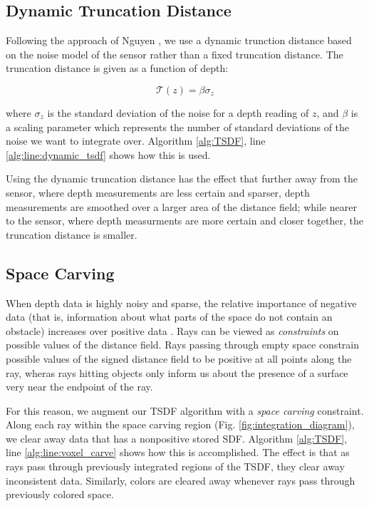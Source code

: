 \documentclass[10pt,twocolumn,letterpaper]{article}
\begin{document}
\subsection{Dynamic Truncation Distance}
\label{section:dynamic_trunc}
Following the approach of Nguyen \etal\cite{Nguyen2012}, we use a dynamic
trunction distance based on the noise model of the sensor rather than a fixed
truncation distance. The truncation distance is given as a function of depth:

\begin{equation} \mathcal{T} (z) = \beta\sigma_{z} \end{equation}

\noindent where $\sigma_{z}$ is the standard deviation of the noise for a depth
reading of $z$, and $\beta$ is a scaling parameter which represents the number of
standard deviations of the noise we want to integrate over. Algorithm
\ref{alg:TSDF}, line \ref{alg:line:dynamic_tsdf} shows how this is used.

Using the dynamic truncation distance has the effect that further away from the
sensor, where depth measurements are less certain and sparser, depth
measurements are smoothed over a larger area of the distance field; while nearer
to the sensor, where depth measurments are more certain and closer together, the
truncation distance is smaller.

\subsection{Space Carving}
\label{section:carving}
When depth data is highly noisy and sparse, the relative importance of negative
data (that is, information about what parts of the space do not contain an
obstacle) increases over positive data \cite{Klingensmith2014}. Rays can be
viewed as \textit{constraints} on possible values of the distance field. Rays
passing through empty space constrain possible values of the signed distance
field to be positive at all points along the ray, wheras rays hitting objects 
only inform us about the presence of a surface very near the endpoint of the ray.

For this reason, we augment our TSDF algorithm with a \textit{space carving}
constraint. Along each ray within the space carving region (Fig.
\ref{fig:integration_diagram}), we clear away data that has a nonpositive stored
SDF. Algorithm \ref{alg:TSDF}, line \ref{alg:line:voxel_carve} shows how this is
accomplished. The effect is that as rays pass through previously integrated
regions of the TSDF, they clear away inconsistent data. Similarly, colors are
cleared away whenever rays pass through previously colored space.
\end{document}
